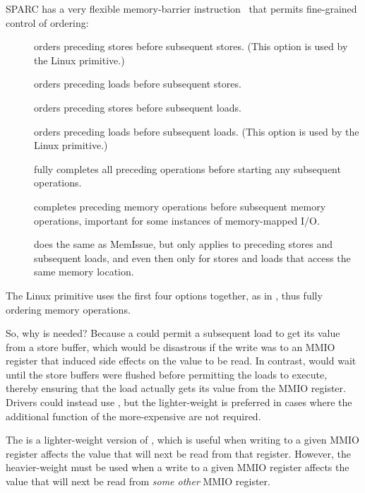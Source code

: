 SPARC has a very flexible memory-barrier instruction~\cite{SPARC94}
that permits fine-grained control of ordering:
\begin{description}
\item	[] orders preceding stores before subsequent stores.
	(This option is used by the Linux  primitive.)
\item	[] orders preceding loads before subsequent stores.
\item	[] orders preceding stores before subsequent loads.
\item	[] orders preceding loads before subsequent loads.
	(This option is used by the Linux  primitive.)
\item	[] fully completes all preceding operations before starting
	any subsequent operations.
\item	[] completes preceding memory operations before subsequent
	memory operations, important for some instances of memory-mapped
	I/O.
\item	[] does the same as MemIssue,
	but only applies to preceding stores
	and subsequent loads, and even then only for stores and loads that
	access the same memory location.
\end{description}

The Linux  primitive uses the first four options together,
as in
,
thus fully ordering memory operations.

So, why is  needed?
Because a  could permit a subsequent
load to get its value from a store buffer, which would be
disastrous if the write was to an MMIO register that induced side effects
on the value to be read.
In contrast,  would wait until the store buffers
were flushed before permitting the loads to execute,
thereby ensuring that the load actually gets its value from the MMIO register.
Drivers could instead use , but the lighter-weight
 is preferred in cases where the additional function
of the more-expensive  are not required.

The  is a lighter-weight version of
, which is useful when writing to a given MMIO register
affects the value that will next be read from that register.
However, the heavier-weight  must be used when
a write to a given MMIO register affects the value that will next be
read from {\em some other} MMIO register.

